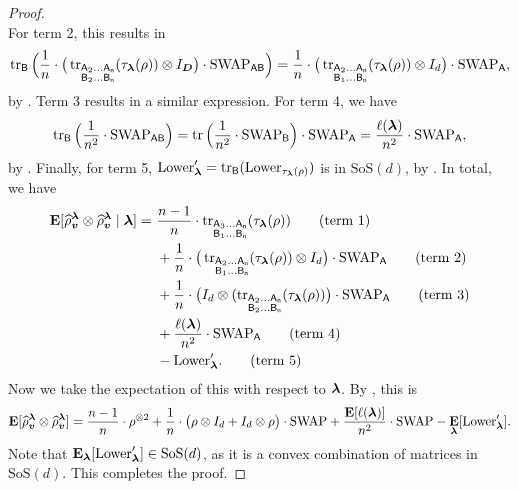 \documentclass{article}
\newcommand{\symsep}{\mathrm{SoS}}
\newcommand{\swap}{\mathrm{SWAP}}
\newcommand{\reg}[1]{\mathsf{#1}}
\begin{document}
\begin{proof}
\begin{equation*}
    \end{equation*}
    For term 2, this results in
    \begin{equation*}
        \tr_{\reg{B}}\Big(\frac{1}{n} \cdot \big(\tr_{\substack{\reg{A}_2 \ldots \reg{A_{n}} \\\reg{B}_2 \ldots \reg{B_{n}}}}(\tau_{\blambda}(\rho)) \otimes I_{\bD}\big)  \cdot \swap_{\reg{A} \reg{B}}\Big)
        = \frac{1}{n} \cdot \big(\tr_{\substack{\reg{A}_2 \ldots \reg{A_{n}} \\\reg{B}_1 \ldots \reg{B_{n}}}}(\tau_{\blambda}(\rho)) \otimes I_{d}\big)  \cdot \swap_{\reg{A}},
    \end{equation*}
    by . Term 3 results in a similar expression.
    For term 4, we have
    \begin{equation*}
        \tr_{\reg{B}}\Big(\frac{1}{n^2}\cdot \swap_{\reg{A} \reg{B}}\Big) = 
        \tr\Big(\frac{1}{n^2}\cdot \swap_{\reg{B}}\Big) \cdot \swap_{\reg{A}}
        = \frac{\ell(\blambda)}{n^2} \cdot \swap_{\reg{A}},
    \end{equation*}
    by . Finally, for term 5, $\mathrm{Lower}_{\blambda}' = \tr_{\reg{B}}(\mathrm{Lower}_{\tau_{\blambda}(\rho)})$ is in $\symsep(d)$, by .
    In total, we have
    \begin{align*}
        \E[\widehat{\rho}_{\bv}^{\blambda}\otimes \widehat{\rho}_{\bv}^{\blambda} \mid \blambda]
        =~&
         \frac{n-1}{n} \cdot \tr_{\substack{\reg{A}_3 \ldots \reg{A_{n}} \\\reg{B}_1 \ldots \reg{B_{n}}}}(\tau_{\blambda}(\rho))\tag{term 1}\\
         &+ \frac{1}{n} \cdot \big(\tr_{\substack{\reg{A}_2 \ldots \reg{A_{n}} \\\reg{B}_1 \ldots \reg{B_{n}}}}(\tau_{\blambda}(\rho)) \otimes I_{d}\big)  \cdot \swap_{\reg{A}}\tag{term 2}\\
         &+ \frac{1}{n} \cdot \big( I_{d} \otimes (\tr_{\substack{\reg{A}_2 \ldots \reg{A_{n}} \\\reg{B}_2 \ldots \reg{B_{n}}}}(\tau_{\blambda}(\rho))\big) \cdot \swap_{\reg{A}}\tag{term 3}\\
         &+ \frac{\ell(\blambda)}{n^2} \cdot \swap_{\reg{A} }\tag{term 4}\\
         &- \mathrm{Lower}_{\blambda}'.\tag{term 5}
    \end{align*}
    Now we take the expectation of this with respect to $\boldsymbol{\lambda}$. By , this is 
    \begin{equation*}
        \E[\widehat{\rho}_{\bv}^{\blambda} \otimes \widehat{\rho}_{\bv}^{\blambda}]
        = \frac{n-1}{n} \cdot \rho^{\otimes 2} + \frac{1}{n} \cdot \big(\rho \otimes I_d + I_d \otimes \rho\big) \cdot \swap + \frac{\E[\ell(\blambda)]}{n^2} \cdot \swap-\E_{\blambda}[\mathrm{Lower}_{\blambda}'].
    \end{equation*}
    Note that $\E_{\blambda}[\mathrm{Lower}_{\blambda}'] \in \symsep(d)$,
    as it is a convex combination of matrices in $\symsep(d)$.
    This completes the proof.
\end{proof}
\end{document}
